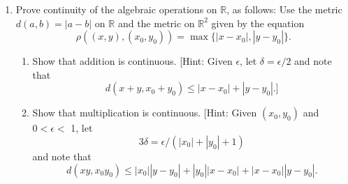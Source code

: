 \begin{enumerate}[itemsep=0.4em, parsep=0pt, topsep=0pt, partopsep=0pt, leftmargin=*, label=\arabic*., ref=\arabic*]
\begin{enumerate}[itemsep=0.2em, parsep=0pt, topsep=0pt, partopsep=0pt, leftmargin=*, label=(\alph*), align=left]
  \item Show that if \(( s_{n})\) is a bounded sequence of real numbers and \(s_{n} \leq {s}_{n + 1}\) for each \(n\), then \(( s_{n})\) converges.
  \item Let \(( a_{n})\) be a sequence of real numbers; define \[ s_{n} = \mathop{\sum }\limits_{{i = 1}}^{n}a_{i} \] If \(s_{n} \rightarrow s\), we say that the infinite series \[ \mathop{\sum }\limits_{{i = 1}}^{\infty }a_{i} \] converges to \(s\) also. Show that if \(\sum {a}_{i}\) converges to \(s\) and \(\sum {b}_{i}\) converges to \(t\), then \(\sum ( {ca_{i} + b_{i}})\) converges to \({cs} + t\).
  \item Prove the comparison test for infinite series: If \(| a_{i}| \leq {b}_{i}\) for each \(i\), and if the series \(\sum {b}_{i}\) converges, then the series \(\sum {a}_{i}\) converges. [Hint: Show that the series \(\sum | a_{i}|\) and \(\sum {c}_{i}\) converge, where \(c_{i} = | a_{i}| + a_{i}\). \(\}\)
  \item Given a sequence of functions \(f_{n} : X \rightarrow \mathbb{R}\), let \[ s_{n}(x) = \mathop{\sum }\limits_{{i = 1}}^{n}f_{i}(x). \] Prove the Weierstrass \(M\) -test for uniform convergence: If \(| {f_{i}(x) }| \leq {M}_{i}\) for all \(x \in X\) and all \(i\), and if the series \(\sum {M}_{i}\) converges, then the sequence \(( s_{n})\) converges uniformly to a function \(s\). [Hint: Let \(r_{n} = \mathop{\sum }\limits_{{i = n + 1}}^{\infty }M_{i}\). Show that if \(k > n\), then \(| {s_{k}(x) - s_{n}(x) }| \leq {r}_{n}\) ; conclude that \(| {s(x) - s_{n}(x) }| \leq {r}_{n}\).]
  \end{enumerate}
\item Prove continuity of the algebraic operations on \(\mathbb{R}\), as follows: Use the metric \(d( {a,b}) = | {a - b}|\) on \(\mathbb{R}\) and the metric on \(\mathbb{R}^{2}\) given by the equation \[ \rho ( {( {x,y}),( {x_{0},y_{0}}) }) = \max \{ {| {x - x_{0}}|,| {y - y_{0}}| }\}. \]
  \begin{enumerate}[itemsep=0.2em, parsep=0pt, topsep=0pt, partopsep=0pt, leftmargin=*, label=(\alph*), align=left]
  \item Show that addition is continuous. [Hint: Given \(\epsilon\), let \(\delta = \epsilon /2\) and note that \[ d( {x + y,x_{0} + y_{0}}) \leq | {x - x_{0}}| + | {y - y_{0}}| .\rbrack \]
  \item Show that multiplication is continuous. [Hint: Given \(( {x_{0},y_{0}})\) and \(0 < \epsilon <\) 1, let \[ {3\delta } = \epsilon /( {| x_{0}| + | y_{0}| + 1}) \] and note that \[ d( {{xy},x_{0}y_{0}}) \leq | x_{0}| | {y - y_{0}}| + | y_{0}| | {x - x_{0}}| + | {x - x_{0}}| | {y - y_{0}}| . \]

\end{enumerate}
\end{enumerate}
